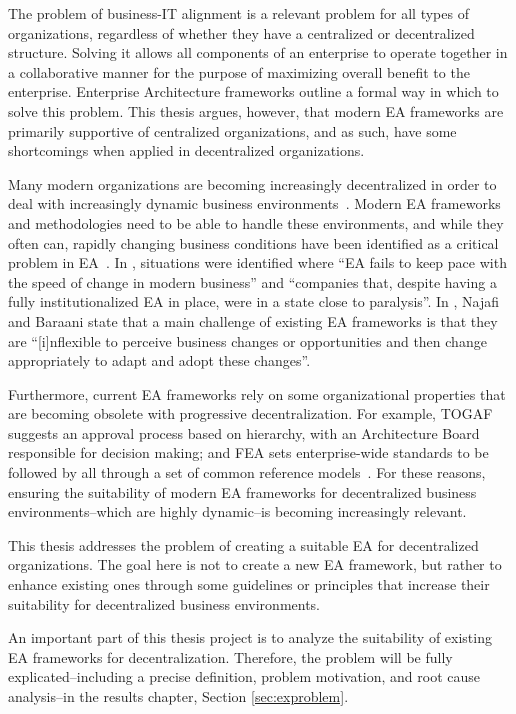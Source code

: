 The problem of business-IT alignment is a relevant problem for all types of organizations, regardless of whether they have a centralized or decentralized structure. Solving it allows all components of an enterprise to operate together in a collaborative manner for the purpose of maximizing overall benefit to the enterprise. Enterprise Architecture frameworks outline a formal way in which to solve this problem. This thesis argues, however, that modern EA frameworks are primarily supportive of centralized organizations, and as such, have some shortcomings when applied in decentralized organizations. 

Many modern organizations are becoming increasingly decentralized in order to deal with increasingly dynamic business environments~\cite{fulk1995}. Modern EA frameworks and methodologies need to be able to handle these environments, and while they often can, rapidly changing business conditions have been identified as a critical problem in EA~\cite{kaisler2005ea,lucke2010critical}. In \cite[Ch. 1]{Bente2012}, situations were identified where ``EA fails to keep pace with the speed of change in modern business'' and ``companies that, despite having a fully institutionalized EA in place, were in a state close to paralysis''. In \cite{najafi2010kasra}, Najafi and Baraani state that a main challenge of existing EA frameworks is that they are ``[i]nflexible to perceive business changes or opportunities and then change appropriately to adapt and adopt these changes''.

Furthermore, current EA frameworks rely on some organizational properties that are becoming obsolete with progressive decentralization. For example, TOGAF~\cite[Ch. 47]{togaf9.1} suggests an approval process based on hierarchy, with an Architecture Board responsible for decision making; and FEA sets enterprise-wide standards to be followed by all through a set of common reference models~\cite{sessions2007}. For these reasons, ensuring the suitability of modern EA frameworks for  decentralized business environments--which are highly dynamic--is becoming increasingly relevant. 

This thesis addresses the problem of creating a suitable EA for decentralized organizations. The goal here is not to create a new EA framework, but rather to enhance existing ones through some guidelines or principles that increase their suitability for decentralized business environments.

An important part of this thesis project is to analyze the suitability of existing EA frameworks for decentralization. Therefore, the problem will be fully explicated--including a precise definition, problem motivation, and root cause analysis--in the results chapter, Section \ref{sec:exproblem}.


